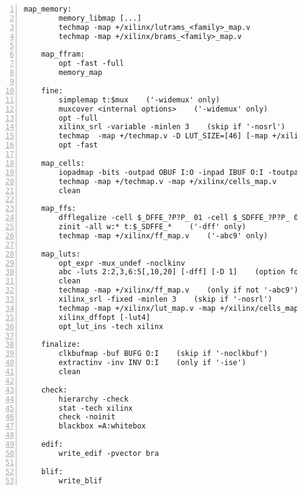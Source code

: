 \begin{lstlisting}[numbers=left,frame=single]
    map_memory:
        memory_libmap [...]
        techmap -map +/xilinx/lutrams_<family>_map.v
        techmap -map +/xilinx/brams_<family>_map.v

    map_ffram:
        opt -fast -full
        memory_map

    fine:
        simplemap t:$mux    ('-widemux' only)
        muxcover <internal options>    ('-widemux' only)
        opt -full
        xilinx_srl -variable -minlen 3    (skip if '-nosrl')
        techmap  -map +/techmap.v -D LUT_SIZE=[46] [-map +/xilinx/mux_map.v] -map +/xilinx/arith_map.v
        opt -fast

    map_cells:
        iopadmap -bits -outpad OBUF I:O -inpad IBUF O:I -toutpad OBUFT ~T:I:O -tinoutpad IOBUF ~T:O:I:IO A:top    (skip if '-noiopad')
        techmap -map +/techmap.v -map +/xilinx/cells_map.v
        clean

    map_ffs:
        dfflegalize -cell $_DFFE_?P?P_ 01 -cell $_SDFFE_?P?P_ 01 -cell $_DLATCH_?P?_ 01    (for xc6v, xc7, xcu, xcup)
        zinit -all w:* t:$_SDFFE_*    ('-dff' only)
        techmap -map +/xilinx/ff_map.v    ('-abc9' only)

    map_luts:
        opt_expr -mux_undef -noclkinv
        abc -luts 2:2,3,6:5[,10,20] [-dff] [-D 1]    (option for '-nowidelut', '-dff', '-retime')
        clean
        techmap -map +/xilinx/ff_map.v    (only if not '-abc9')
        xilinx_srl -fixed -minlen 3    (skip if '-nosrl')
        techmap -map +/xilinx/lut_map.v -map +/xilinx/cells_map.v -D LUT_WIDTH=[46]
        xilinx_dffopt [-lut4]
        opt_lut_ins -tech xilinx

    finalize:
        clkbufmap -buf BUFG O:I    (skip if '-noclkbuf')
        extractinv -inv INV O:I    (only if '-ise')
        clean

    check:
        hierarchy -check
        stat -tech xilinx
        check -noinit
        blackbox =A:whitebox

    edif:
        write_edif -pvector bra 

    blif:
        write_blif 
\end{lstlisting}

